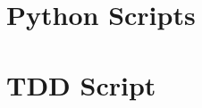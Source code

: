\documentclass[11pt]{report}
\begin{document}
\FloatBarrier
\chapter{Python Scripts}



\newpage

\chapter{TDD Script}



\clearpage
{}
\printindex
\end{document}

